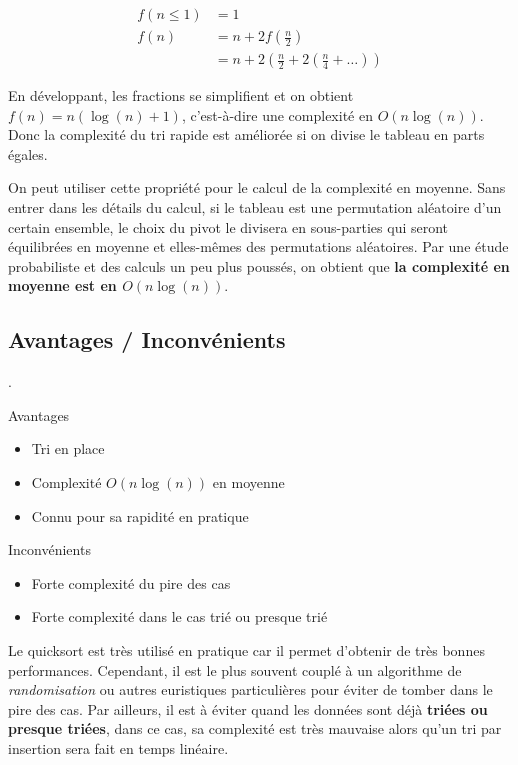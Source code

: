 \documentclass{../cours}
\begin{document}
\begin{align}
f( n \leq 1) &= 1 \\
f(n) &= n + 2 f \left(\frac{n}{2} \right) \\
     &= n + 2 \left( \frac{n}{2} + 2 \left( \frac{n}{ 4} + \dots \right) \right)
\end{align}

En développant, les fractions se simplifient et on obtient $f(n) = n(\log(n) + 1)$, c'est-à-dire une complexité en $O(n \log(n))$. Donc la complexité du tri rapide est améliorée si on divise le tableau en parts égales.

On peut utiliser cette propriété pour le calcul de la complexité en moyenne. Sans entrer dans les détails du calcul, si le tableau est une permutation aléatoire d'un certain ensemble, le choix du pivot le divisera en sous-parties qui seront équilibrées en moyenne et elles-mêmes des permutations aléatoires. Par une étude probabiliste et des calculs un peu plus poussés, on obtient que \textbf{la complexité en moyenne est en $O(n \log(n))$}.


\subsection{Avantages / Inconvénients}

.

\begin{minipage}[t]{0.49 \textwidth}
Avantages

\begin{itemize}
\item Tri en place 
\item Complexité $O(n \log(n))$ en moyenne
\item Connu pour sa rapidité en pratique
\end{itemize}

\end{minipage}
\begin{minipage}[t]{0.49 \textwidth}
Inconvénients

\begin{itemize}
\item Forte complexité du pire des cas
\item Forte complexité dans le cas trié ou presque trié
\end{itemize}
\end{minipage}

\vspace{0.5cm}

Le quicksort est très utilisé en pratique car il permet d'obtenir de très bonnes performances. Cependant,
il est le plus souvent couplé à un algorithme de \textit{randomisation} ou autres euristiques particulières 
pour éviter de tomber dans le pire des cas. Par ailleurs, il est à éviter quand les données sont déjà \textbf{triées ou presque triées}, dans ce cas, sa complexité est très mauvaise alors qu'un tri par insertion sera fait en temps linéaire.
\end{document}
